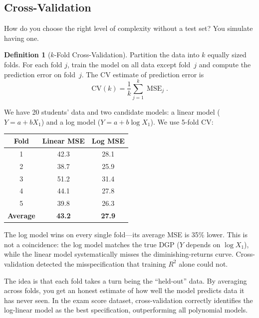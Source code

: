 \documentclass[11pt,a4paper]{article}
\theoremstyle{definition}
\newtheorem{definition}{Definition}[section]
\theoremstyle{plain}
\theoremstyle{remark}
\newcommand{\MSE}{\operatorname{MSE}}
\begin{document}
\subsection{Cross-Validation}

How do you choose the right level of complexity without a test set? You simulate having one.

\begin{definition}[$k$-Fold Cross-Validation]
Partition the data into $k$ equally sized folds.  For each fold $j$, train the model on all data except fold~$j$ and compute the prediction error on fold~$j$.
The CV estimate of prediction error is
\[
  \text{CV}(k) = \frac{1}{k} \sum_{j=1}^{k} \MSE_j.
\]
\end{definition}

\begin{numermark}[title={Cross-Validation: Picking the Right Model}]
We have 20 students' data and two candidate models: a linear model ($Y = a + bX_1$) and a log model ($Y = a + b\log X_1$). We use 5-fold CV:

\begin{center}
\begin{tabular}{@{}ccc@{}}
\toprule
\textbf{Fold} & \textbf{Linear MSE} & \textbf{Log MSE} \\
\midrule
1 & 42.3 & 28.1 \\
2 & 38.7 & 25.9 \\
3 & 51.2 & 31.4 \\
4 & 44.1 & 27.8 \\
5 & 39.8 & 26.3 \\
\midrule
\textbf{Average} & \textbf{43.2} & \textbf{27.9} \\
\bottomrule
\end{tabular}
\end{center}

The log model wins on every single fold---its average MSE is 35\% lower. This is not a coincidence: the log model matches the true DGP ($Y$ depends on $\log X_1$), while the linear model systematically misses the diminishing-returns curve. Cross-validation detected the misspecification that training $R^2$ alone could not.
\end{numermark}

The idea is that each fold takes a turn being the ``held-out'' data. By averaging across folds, you get an honest estimate of how well the model predicts data it has never seen. In the exam score dataset, cross-validation correctly identifies the log-linear model as the best specification, outperforming all polynomial models.
\end{document}
